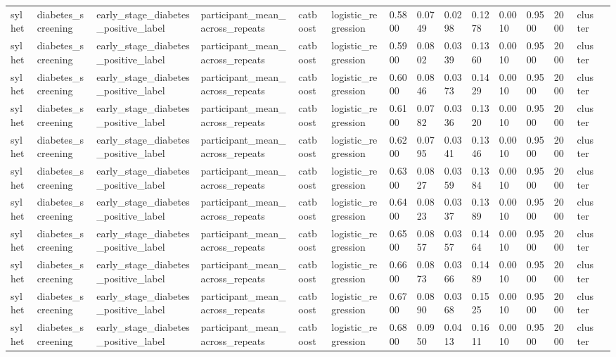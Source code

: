 \begin{tabular}{lllllllllllllll}
sylhet & diabetes\_screening & early\_stage\_diabetes\_positive\_label & participant\_mean\_across\_repeats & catboost & logistic\_regression & 0.5800 & 0.0749 & 0.0298 & 0.1278 & 0.0010 & 0.9500 & 2000 & cluster &  \\
sylhet & diabetes\_screening & early\_stage\_diabetes\_positive\_label & participant\_mean\_across\_repeats & catboost & logistic\_regression & 0.5900 & 0.0802 & 0.0339 & 0.1360 & 0.0010 & 0.9500 & 2000 & cluster &  \\
sylhet & diabetes\_screening & early\_stage\_diabetes\_positive\_label & participant\_mean\_across\_repeats & catboost & logistic\_regression & 0.6000 & 0.0846 & 0.0373 & 0.1429 & 0.0010 & 0.9500 & 2000 & cluster &  \\
sylhet & diabetes\_screening & early\_stage\_diabetes\_positive\_label & participant\_mean\_across\_repeats & catboost & logistic\_regression & 0.6100 & 0.0782 & 0.0336 & 0.1320 & 0.0010 & 0.9500 & 2000 & cluster &  \\
sylhet & diabetes\_screening & early\_stage\_diabetes\_positive\_label & participant\_mean\_across\_repeats & catboost & logistic\_regression & 0.6200 & 0.0795 & 0.0341 & 0.1346 & 0.0010 & 0.9500 & 2000 & cluster &  \\
sylhet & diabetes\_screening & early\_stage\_diabetes\_positive\_label & participant\_mean\_across\_repeats & catboost & logistic\_regression & 0.6300 & 0.0827 & 0.0359 & 0.1384 & 0.0010 & 0.9500 & 2000 & cluster &  \\
sylhet & diabetes\_screening & early\_stage\_diabetes\_positive\_label & participant\_mean\_across\_repeats & catboost & logistic\_regression & 0.6400 & 0.0823 & 0.0337 & 0.1389 & 0.0010 & 0.9500 & 2000 & cluster &  \\
sylhet & diabetes\_screening & early\_stage\_diabetes\_positive\_label & participant\_mean\_across\_repeats & catboost & logistic\_regression & 0.6500 & 0.0857 & 0.0357 & 0.1464 & 0.0010 & 0.9500 & 2000 & cluster &  \\
sylhet & diabetes\_screening & early\_stage\_diabetes\_positive\_label & participant\_mean\_across\_repeats & catboost & logistic\_regression & 0.6600 & 0.0873 & 0.0366 & 0.1489 & 0.0010 & 0.9500 & 2000 & cluster &  \\
sylhet & diabetes\_screening & early\_stage\_diabetes\_positive\_label & participant\_mean\_across\_repeats & catboost & logistic\_regression & 0.6700 & 0.0890 & 0.0368 & 0.1525 & 0.0010 & 0.9500 & 2000 & cluster &  \\
sylhet & diabetes\_screening & early\_stage\_diabetes\_positive\_label & participant\_mean\_across\_repeats & catboost & logistic\_regression & 0.6800 & 0.0950 & 0.0413 & 0.1611 & 0.0010 & 0.9500 & 2000 & cluster &  \\

\end{tabular}
